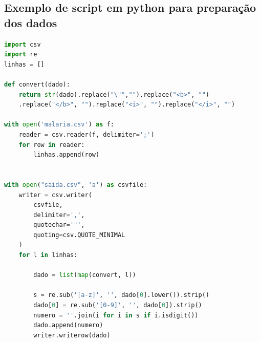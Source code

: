 \documentclass[
	12pt,				%
	openright,			%
	oneside,			%
	a4paper,			%
	chapter=TITLE,		%
	section=TITLE,		%
	subsection=TITLE,	%
	subsubsection=TITLE,%
	english,			%
	brazil				%
	]{abntex2}
\theoremstyle{definition}
\begin{document}
\begin{apendicesenv}
	
	\partapendices
	
\chapter{Exemplo de script em python para preparação dos dados}
\begin{lstlisting}[language=Python]
import csv
import re
linhas = []

def convert(dado):
    return str(dado).replace("\"","").replace("<b>", "")
    .replace("</b>", "").replace("<i>", "").replace("</i>", "")

with open('malaria.csv') as f:
    reader = csv.reader(f, delimiter=';')
    for row in reader:
        linhas.append(row)


with open("saida.csv", 'a') as csvfile:
    writer = csv.writer(
        csvfile, 
        delimiter=',', 
        quotechar='"',
        quoting=csv.QUOTE_MINIMAL
    )
    for l in linhas:

        dado = list(map(convert, l))

        s = re.sub('[a-z]', '', dado[0].lower()).strip()
        dado[0] = re.sub('[0-9]', '', dado[0]).strip()
        numero = ''.join(i for i in s if i.isdigit())
        dado.append(numero)
        writer.writerow(dado)

\end{lstlisting}

	
\end{apendicesenv}


	
	
	
\end{document}
